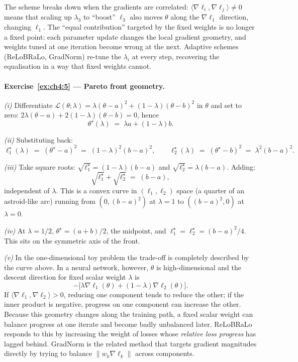 \documentclass[11pt,a4paper]{report}
\begin{document}
The scheme breaks down when the gradients are correlated: $\langle \nabla\ell_i, \nabla\ell_j\rangle \neq 0$ means that scaling up $\lambda_3$ to ``boost'' $\ell_3$ also moves $\theta$ along the $\nabla\ell_1$ direction, changing $\ell_1$.  The ``equal contribution'' targeted by the fixed weights is no longer a fixed point: each parameter update changes the local gradient geometry, and weights tuned at one iteration become wrong at the next.  Adaptive schemes (ReLoBRaLo, GradNorm) re-tune the $\lambda_i$ at every step, recovering the equalisation in a way that fixed weights cannot.

\paragraph{Exercise~\ref{ex:ch4:5} --- Pareto front geometry.}
\emph{(i)} Differentiate $\mathcal{L}(\theta;\lambda) = \lambda(\theta-a)^2 + (1-\lambda)(\theta-b)^2$ in $\theta$ and set to zero: $2\lambda(\theta - a) + 2(1-\lambda)(\theta - b) = 0$, hence
\[
   \theta^\star(\lambda) \;=\; \lambda a + (1-\lambda) b.
\]

\emph{(ii)} Substituting back:
\[
   \ell_1^\star(\lambda) \;=\; (\theta^\star - a)^2 \;=\; (1-\lambda)^2 (b-a)^2,
   \qquad
   \ell_2^\star(\lambda) \;=\; (\theta^\star - b)^2 \;=\; \lambda^2 (b-a)^2.
\]

\emph{(iii)} Take square roots: $\sqrt{\ell_1^\star} = (1-\lambda)(b-a)$ and $\sqrt{\ell_2^\star} = \lambda(b-a)$.  Adding:
\[
   \sqrt{\ell_1^\star} + \sqrt{\ell_2^\star} \;=\; (b - a),
\]
independent of $\lambda$.  This is a convex curve in $(\ell_1, \ell_2)$ space (a quarter of an astroid-like arc) running from $(0, (b-a)^2)$ at $\lambda = 1$ to $((b-a)^2, 0)$ at $\lambda = 0$.

\emph{(iv)} At $\lambda = 1/2$, $\theta^\star = (a+b)/2$, the midpoint, and $\ell_1^\star = \ell_2^\star = (b-a)^2/4$.  This sits on the symmetric axis of the front.

\emph{(v)} In the one-dimensional toy problem the trade-off is completely described by the curve above.  In a neural network, however, $\theta$ is high-dimensional and the descent direction for fixed scalar weight $\lambda$ is
\[
   -\bigl[\lambda \nabla \ell_1(\theta) + (1-\lambda)\nabla \ell_2(\theta)\bigr].
\]
If $\langle\nabla\ell_1,\nabla\ell_2\rangle>0$, reducing one component tends to reduce the other; if the inner product is negative, progress on one component can increase the other.  Because this geometry changes along the training path, a fixed scalar weight can balance progress at one iterate and become badly unbalanced later.  ReLoBRaLo responds to this by increasing the weight of losses whose \emph{relative loss progress} has lagged behind.  GradNorm is the related method that targets gradient magnitudes directly by trying to balance $\|w_k\nabla\ell_k\|$ across components.
\end{document}
